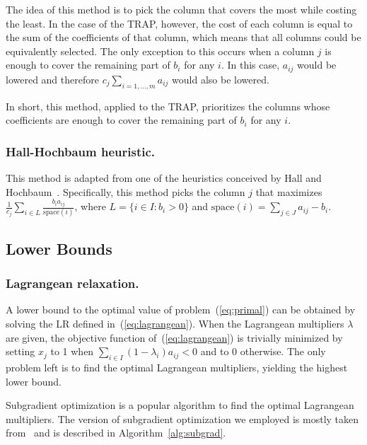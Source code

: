 \documentclass[runningheads]{llncs}
\begin{document}
The idea of this method is to pick the column that covers the most while costing the least. In the case of the TRAP, however, the cost of each column is equal to the sum of the coefficients of that column, which means that all columns could be equivalently selected. The only exception to this occurs when a column $j$ is enough to cover the remaining part of $b_i$ for any $i$. In this case, $a_{ij}$ would be lowered and therefore $c_j \sum_{i=1,\dots,m} a_{ij}$ would also be lowered. 

In short, this method, applied to the TRAP, prioritizes the columns whose coefficients are enough to cover the remaining part of $b_i$ for any $i$. 

\subsubsection{Hall-Hochbaum heuristic.} This method is adapted from one of the heuristics conceived by Hall and Hochbaum~\cite{hall-hochbaum-1992-multicovering}. Specifically, this method picks the column $j$ that maximizes $\frac{1}{c_j} \sum_{i \in L} \frac{b_i a_{ij}}{\text{space}(i)}$, where $L = \{i \in I : b_i > 0 \}$ and $\text{space}(i) = \sum_{j \in J} a_{ij} - b_i$.

\subsection{Lower Bounds}
\label{subsec:branch-bound:lb}

\subsubsection{Lagrangean relaxation.} A lower bound to the optimal value of problem~(\ref{eq:primal}) can be obtained by solving the LR defined in~(\ref{eq:lagrangean}). When the Lagrangean multipliers $\lambda$ are given, the objective function of~(\ref{eq:lagrangean}) is trivially minimized by setting $x_j$ to 1 when $\sum_{i \in I} (1 - \lambda_i) a_{ij} < 0$ and to 0 otherwise. The only problem left is to find the optimal Lagrangean multipliers, yielding the highest lower bound.

Subgradient optimization is a popular algorithm to find the optimal Lagrangean multipliers. The version of subgradient optimization we employed is mostly taken from~\cite{balas-carrera-1996-dynamic} and is described in Algorithm~\ref{alg:subgrad}.
\end{document}
